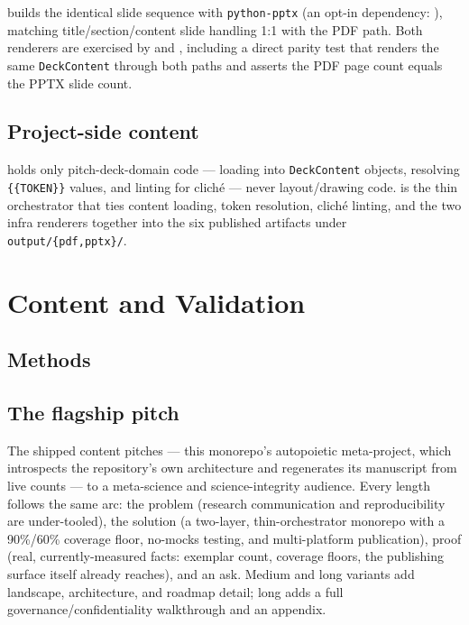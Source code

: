 \documentclass[
  english,
]{article}
\begin{document}
 builds the
identical slide sequence with \texttt{python-pptx} (an opt-in
dependency: ), matching
title/section/content slide handling 1:1 with the PDF path. Both
renderers are exercised by
 and
, including a direct parity test that
renders the same \texttt{DeckContent} through both paths and asserts the
PDF page count equals the PPTX slide count.

\subsection{Project-side content}\label{project-side-content}

 holds only
pitch-deck-domain code --- loading
 into \texttt{DeckContent}
objects, resolving \texttt{\{\{TOKEN\}\}} values, and linting for cliché
--- never layout/drawing code.  is
the thin orchestrator that ties content loading, token resolution,
cliché linting, and the two infra renderers together into the six
published artifacts under \texttt{output/\{pdf,pptx\}/}.

\newpage

\section{Content and Validation}\label{sec:validation}

\subsection{Methods}\label{methods}

\subsection{The flagship pitch}\label{the-flagship-pitch}

The shipped content pitches
\href{../../template_template/}{} --- this
monorepo's autopoietic meta-project, which introspects the repository's
own architecture and regenerates its manuscript from live counts --- to
a meta-science and science-integrity audience. Every length follows the
same arc: the problem (research communication and reproducibility are
under-tooled), the solution (a two-layer, thin-orchestrator monorepo
with a 90\%/60\% coverage floor, no-mocks testing, and multi-platform
publication), proof (real, currently-measured facts: exemplar count,
coverage floors, the publishing surface 
itself already reaches), and an ask. Medium and long variants add
landscape, architecture, and roadmap detail; long adds a full
governance/confidentiality walkthrough and an appendix.
\end{document}

